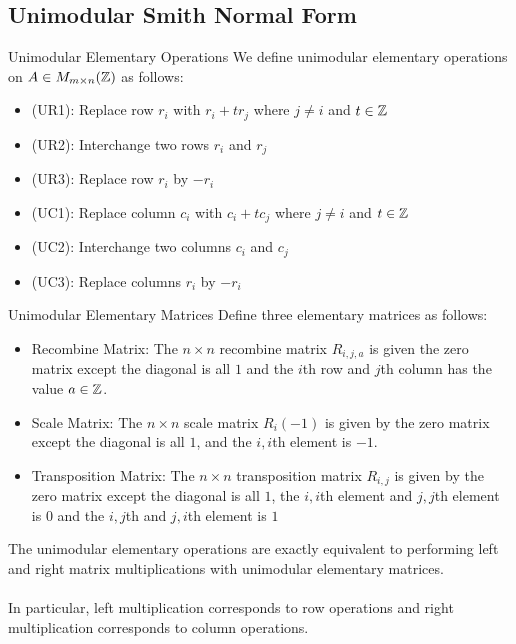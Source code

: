 \documentclass[a4paper]{article}
\begin{document}
\subsection{Unimodular Smith Normal Form}
\begin{defn}{Unimodular Elementary Operations}{} We define unimodular elementary operations on $A\in M_{m\times n}(\mathbb{Z})$ as follows: 
\begin{itemize}
\item (UR1): Replace row $r_i$ with $r_i+tr_j$ where $j\neq i$ and $t\in\mathbb{Z}$
\item (UR2): Interchange two rows $r_i$ and $r_j$
\item (UR3): Replace row $r_i$ by $-r_i$
\item (UC1): Replace column $c_i$ with $c_i+tc_j$ where $j\neq i$ and $t\in\mathbb{Z}$
\item (UC2): Interchange two columns $c_i$ and $c_j$
\item (UC3): Replace columns $r_i$ by $-r_i$
\end{itemize}
\end{defn}

\begin{defn}{Unimodular Elementary Matrices}{} Define three elementary matrices as follows: 
\begin{itemize}
\item Recombine Matrix: The $n\times n$ recombine matrix $R_{i,j,a}$ is given the zero matrix except the diagonal is all $1$ and the $i$th row and $j$th column has the value $a\in\mathbb{Z}$. 
\item Scale Matrix: The $n\times n$ scale matrix $R_{i}(-1)$ is given by  the zero matrix except the diagonal is all $1$, and the $i,i$th element is $-1$. 
\item Transposition Matrix: The $n\times n$ transposition matrix $R_{i,j}$ is given by the zero matrix except the diagonal is all $1$, the $i,i$th element and $j,j$th element is $0$ and the $i,j$th and $j,i$th element is $1$
\end{itemize}
\end{defn}

\begin{prp}{}{} The unimodular elementary operations are exactly equivalent to performing left and right matrix multiplications with unimodular elementary matrices. \\~\\
In particular, left multiplication corresponds to row operations and right multiplication corresponds to column operations. 
\end{prp}
\end{document}
